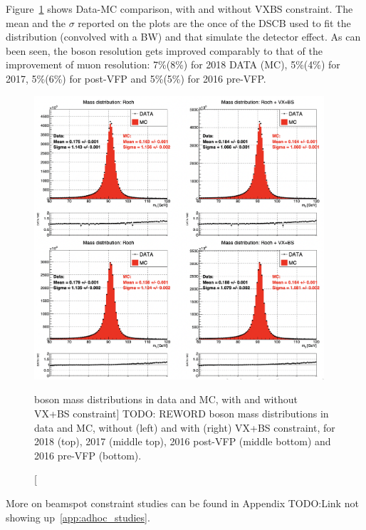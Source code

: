 Figure~\ref{UL_ZBoson_DataMC_comparison_VXBS} shows Data-MC comparison, with and without VXBS constraint.
The mean and the $\sigma$ reported on the plots are the once of the DSCB used to fit the distribution (convolved with a BW) and that simulate the detector effect.
As can been seen, the \PZ boson resolution gets improved comparably to that of the improvement of muon \pT resolution:
7\%(8\%) for 2018 DATA (MC), 5\%(4\%) for 2017, 5\%(6\%) for post-VFP and 5\%(5\%) for 2016 pre-VFP. 
\begin{figure}[!htbp]
\begin{center}
	\includegraphics[width=0.96\textwidth]{figures/higgsmassmeas/vxbs/vxbs_mZdist_2017_2018.png}
    \caption
        [\PZ boson mass distributions in data and MC, with and without VX+BS constraint]
        {TODO: REWORD \PZ boson mass distributions in data and MC, without (left) and with (right) VX+BS constraint,
        for 2018 (top), 2017 (middle top), 2016 post-VFP (middle bottom) and 2016 pre-VFP (bottom).
        }
\label{UL_ZBoson_DataMC_comparison_VXBS}
\end{center}
\end{figure}

More on beamspot constraint studies can be found in Appendix TODO:Link not showing up~\ref{app:adhoc_studies}.


